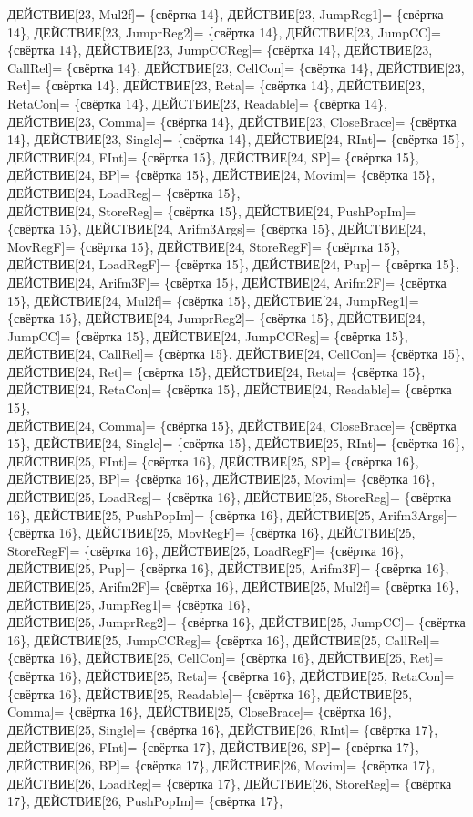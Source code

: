 \documentclass[a0]{a0poster}
\begin{document}
ДЕЙСТВИЕ[23, Mul2f]= \{свёртка 14\}, ДЕЙСТВИЕ[23, JumpReg1]= \{свёртка 14\}, ДЕЙСТВИЕ[23, JumprReg2]= \{свёртка 14\}, ДЕЙСТВИЕ[23, JumpCC]= \{свёртка 14\}, ДЕЙСТВИЕ[23, JumpCCReg]= \{свёртка 14\}, ДЕЙСТВИЕ[23, CallRel]= \{свёртка 14\}, ДЕЙСТВИЕ[23, CellCon]= \{свёртка 14\}, ДЕЙСТВИЕ[23, Ret]= \{свёртка 14\}, ДЕЙСТВИЕ[23, Reta]= \{свёртка 14\}, ДЕЙСТВИЕ[23, RetaCon]= \{свёртка 14\}, ДЕЙСТВИЕ[23, Readable]= \{свёртка 14\}, ДЕЙСТВИЕ[23, Comma]= \{свёртка 14\}, ДЕЙСТВИЕ[23, CloseBrace]= \{свёртка 14\}, ДЕЙСТВИЕ[23, Single]= \{свёртка 14\}, ДЕЙСТВИЕ[24, RInt]= \{свёртка 15\}, ДЕЙСТВИЕ[24, FInt]= \{свёртка 15\}, ДЕЙСТВИЕ[24, SP]= \{свёртка 15\}, ДЕЙСТВИЕ[24, BP]= \{свёртка 15\}, ДЕЙСТВИЕ[24, Movim]= \{свёртка 15\}, ДЕЙСТВИЕ[24, LoadReg]= \{свёртка 15\}, \\
ДЕЙСТВИЕ[24, StoreReg]= \{свёртка 15\}, ДЕЙСТВИЕ[24, PushPopIm]= \{свёртка 15\}, ДЕЙСТВИЕ[24, Arifm3Args]= \{свёртка 15\}, ДЕЙСТВИЕ[24, MovRegF]= \{свёртка 15\}, ДЕЙСТВИЕ[24, StoreRegF]= \{свёртка 15\}, ДЕЙСТВИЕ[24, LoadRegF]= \{свёртка 15\}, ДЕЙСТВИЕ[24, Pup]= \{свёртка 15\}, ДЕЙСТВИЕ[24, Arifm3F]= \{свёртка 15\}, ДЕЙСТВИЕ[24, Arifm2F]= \{свёртка 15\}, ДЕЙСТВИЕ[24, Mul2f]= \{свёртка 15\}, ДЕЙСТВИЕ[24, JumpReg1]= \{свёртка 15\}, ДЕЙСТВИЕ[24, JumprReg2]= \{свёртка 15\}, ДЕЙСТВИЕ[24, JumpCC]= \{свёртка 15\}, ДЕЙСТВИЕ[24, JumpCCReg]= \{свёртка 15\}, ДЕЙСТВИЕ[24, CallRel]= \{свёртка 15\}, ДЕЙСТВИЕ[24, CellCon]= \{свёртка 15\}, ДЕЙСТВИЕ[24, Ret]= \{свёртка 15\}, ДЕЙСТВИЕ[24, Reta]= \{свёртка 15\}, ДЕЙСТВИЕ[24, RetaCon]= \{свёртка 15\}, ДЕЙСТВИЕ[24, Readable]= \{свёртка 15\}, \\
ДЕЙСТВИЕ[24, Comma]= \{свёртка 15\}, ДЕЙСТВИЕ[24, CloseBrace]= \{свёртка 15\}, ДЕЙСТВИЕ[24, Single]= \{свёртка 15\}, ДЕЙСТВИЕ[25, RInt]= \{свёртка 16\}, ДЕЙСТВИЕ[25, FInt]= \{свёртка 16\}, ДЕЙСТВИЕ[25, SP]= \{свёртка 16\}, ДЕЙСТВИЕ[25, BP]= \{свёртка 16\}, ДЕЙСТВИЕ[25, Movim]= \{свёртка 16\}, ДЕЙСТВИЕ[25, LoadReg]= \{свёртка 16\}, ДЕЙСТВИЕ[25, StoreReg]= \{свёртка 16\}, ДЕЙСТВИЕ[25, PushPopIm]= \{свёртка 16\}, ДЕЙСТВИЕ[25, Arifm3Args]= \{свёртка 16\}, ДЕЙСТВИЕ[25, MovRegF]= \{свёртка 16\}, ДЕЙСТВИЕ[25, StoreRegF]= \{свёртка 16\}, ДЕЙСТВИЕ[25, LoadRegF]= \{свёртка 16\}, ДЕЙСТВИЕ[25, Pup]= \{свёртка 16\}, ДЕЙСТВИЕ[25, Arifm3F]= \{свёртка 16\}, ДЕЙСТВИЕ[25, Arifm2F]= \{свёртка 16\}, ДЕЙСТВИЕ[25, Mul2f]= \{свёртка 16\}, ДЕЙСТВИЕ[25, JumpReg1]= \{свёртка 16\}, \\
ДЕЙСТВИЕ[25, JumprReg2]= \{свёртка 16\}, ДЕЙСТВИЕ[25, JumpCC]= \{свёртка 16\}, ДЕЙСТВИЕ[25, JumpCCReg]= \{свёртка 16\}, ДЕЙСТВИЕ[25, CallRel]= \{свёртка 16\}, ДЕЙСТВИЕ[25, CellCon]= \{свёртка 16\}, ДЕЙСТВИЕ[25, Ret]= \{свёртка 16\}, ДЕЙСТВИЕ[25, Reta]= \{свёртка 16\}, ДЕЙСТВИЕ[25, RetaCon]= \{свёртка 16\}, ДЕЙСТВИЕ[25, Readable]= \{свёртка 16\}, ДЕЙСТВИЕ[25, Comma]= \{свёртка 16\}, ДЕЙСТВИЕ[25, CloseBrace]= \{свёртка 16\}, ДЕЙСТВИЕ[25, Single]= \{свёртка 16\}, ДЕЙСТВИЕ[26, RInt]= \{свёртка 17\}, ДЕЙСТВИЕ[26, FInt]= \{свёртка 17\}, ДЕЙСТВИЕ[26, SP]= \{свёртка 17\}, ДЕЙСТВИЕ[26, BP]= \{свёртка 17\}, ДЕЙСТВИЕ[26, Movim]= \{свёртка 17\}, ДЕЙСТВИЕ[26, LoadReg]= \{свёртка 17\}, ДЕЙСТВИЕ[26, StoreReg]= \{свёртка 17\}, ДЕЙСТВИЕ[26, PushPopIm]= \{свёртка 17\}, \\
\end{document}
